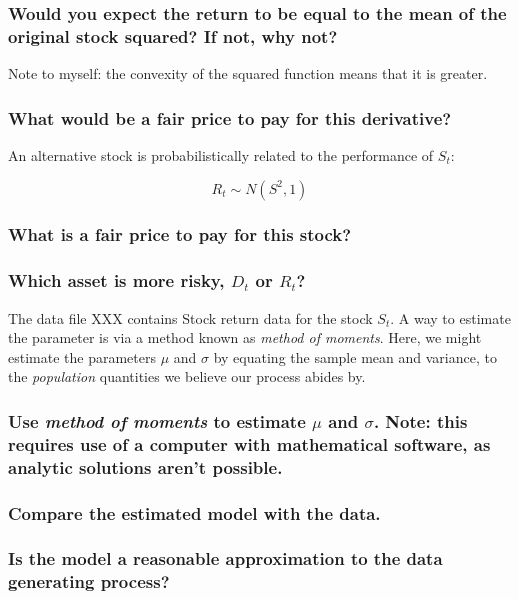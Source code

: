 \documentclass[11pt,fullpage]{book}
\begin{document}
\subsubsection{Would you expect the return to be equal to the mean of the original stock squared? If not, why not?}
Note to myself: the convexity of the squared function means that it is greater.
\subsubsection{What would be a fair price to pay for this derivative?}

An alternative stock is probabilistically related to the performance of $S_t$:

\begin{equation}
R_t \sim N(S^2,1)
\end{equation}

\subsubsection{What is a fair price to pay for this stock?}
\subsubsection{Which asset is more risky, $D_t$ or $R_t$?}

The data file XXX contains Stock return data for the stock $S_t$. A way to estimate the parameter is via a method known as \textit{method of moments}. Here, we might estimate the parameters $\mu$ and $\sigma$ by equating the sample mean and variance, to the \textit{population} quantities we believe our process abides by.

\subsubsection{Use \textit{method of moments} to estimate $\mu$ and $\sigma$. Note: this requires use of a computer with mathematical software, as analytic solutions aren't possible.}

\subsubsection{Compare the estimated model with the data.}
\subsubsection{Is the model a reasonable approximation to the data generating process?}
\end{document}
